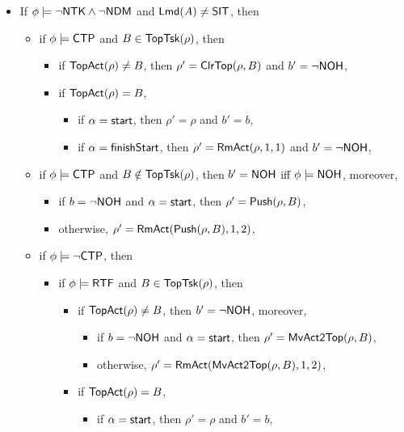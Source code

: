 \smallskip
\noindent {}
\begin{itemize}
	\item If $\phi \models \neg {\sf NTK}\wedge\neg{\sf NDM}$ and ${\sf Lmd}(A)\neq {\sf SIT}$, then
	\begin{itemize}
		\item if $\phi \models {\sf CTP}$ and $B \in \mathsf{TopTsk}(\rho)$, then 
		\begin{itemize}
			\item if $\mathsf{TopAct}(\rho) \neq B$, then $\rho' = \mathsf{ClrTop}(\rho, B)$ and $b' = \neg {\sf NOH}$,
			\item if $\mathsf{TopAct}(\rho) = B$, 
			\begin{itemize}
				\item if $\alpha = {\mathsf{start} }$, then $\rho' = \rho$ and $b' = b$,
				\item if $\alpha = {\mathsf{finishStart} }$, then $\rho' = \mathsf{RmAct}(\rho, 1, 1)$ and $b' = \neg{\sf NOH}$,
			\end{itemize}
		\end{itemize}
		\item if $\phi \models {\sf CTP}$ and $B \notin \mathsf{TopTsk}(\rho)$, then $b' = {\sf NOH}$ iff $\phi \models {\sf NOH}$, moreover,
		\begin{itemize}
			\item if $b = \neg {\sf NOH}$ and $\alpha = {\mathsf{start} }$, then $\rho' = \mathsf{Push}(\rho, B)$, 
			\item otherwise, $\rho' = \mathsf{RmAct}( \mathsf{Push}(\rho, B), 1, 2)$,
		\end{itemize}
		\item if $\phi \models \neg {\sf CTP}$, then
		\begin{itemize}
			\item if $\phi \models {\sf RTF}$ and $B \in \mathsf{TopTsk}(\rho)$, then
			\begin{itemize}
				\item if $\mathsf{TopAct}(\rho) \neq B$, then $b' = \neg {\sf NOH}$, moreover, 
				\begin{itemize}
					\item if $b = \neg {\sf NOH}$ and $\alpha = {\mathsf{start} }$, then $\rho'= \mathsf{MvAct2Top}(\rho, B)$, 
					\item otherwise, $\rho' = \mathsf{RmAct}(\mathsf{MvAct2Top}(\rho, B), 1, 2)$, 
				\end{itemize}
				\item if $\mathsf{TopAct}(\rho) = B$, 
				\begin{itemize}
					\item if $\alpha = {\mathsf{start} }$, then $\rho' = \rho$ and $b' = b$,

\end{itemize}
\end{itemize}
\end{itemize}
\end{itemize}
\end{itemize}

